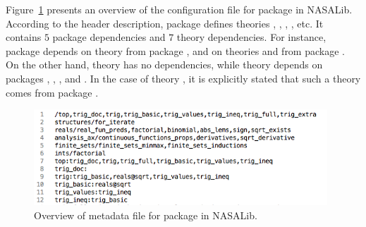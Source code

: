 Figure~\ref{fig.top} presents an overview of the configuration file
for package  in NASALib. According to the header
description, package  defines theories ,
, , , etc. It contains $5$
package dependencies and $7$ theory dependencies. For instance,
package  depends on theory  from package
, and on theories  and
 from package . On the
other hand, theory  has no dependencies, while theory
 depends on packages , ,
, and . In the case of theory
, it is explicitly stated that such a theory comes
from package .

\begin{figure}
  \centering
  \includegraphics[width=11cm]{images/top.png}
  \caption{Overview of metadata file for package  in NASALib.}
  \label{fig.top}
\end{figure}
